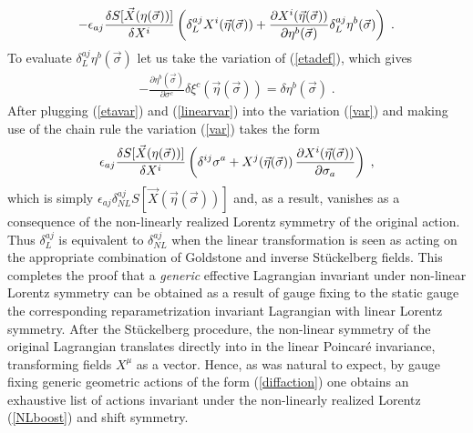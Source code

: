 \documentclass[%
 reprint,
 amsmath,amssymb,
 aps,
]{revtex4-1}
\begin{document}
\begin{gather}
\label{var}
-\epsilon_{a j} {\delta S[\vec{X}(\eta(\vec{\sigma}))]\over \delta X^i}
\left(\delta^{a j}_L X^i(\vec{\eta}(\vec{\sigma})) +
    \frac{\partial X^i (\vec{\eta}(\vec{\sigma}))}{\partial \eta^b(\vec{\sigma})}
    \delta^{a j}_L \eta^b(\vec{\sigma})\right) \; .
\end{gather}
To evaluate $\delta^{a j}_L \eta^b(\vec{\sigma})$ let us take the variation of (\ref{etadef}), which gives
\begin{eqnarray}
\label{etavar}
    - \frac{\partial \eta^b (\vec{\sigma})}{\partial \sigma^c} \delta \xi^c (\vec{\eta}(\vec{\sigma}))
    = \delta \eta^b(\vec{\sigma}) \; .
\end{eqnarray}
After plugging (\ref{etavar}) and (\ref{linearvar}) into the variation (\ref{var}) and making use of the chain rule the variation
(\ref{var}) takes the form
\begin{eqnarray}
    \epsilon_{a j} {\delta S[\vec{X}(\eta(\vec{\sigma}))]\over \delta X^i} \left( \delta^{i j} \sigma^a + X^j(\vec{\eta}(\vec{\sigma})) \,
    \frac{\partial X^i(\vec{\eta}(\vec{\sigma}))}{\partial \sigma_a} \right) \; ,
    \nonumber
\end{eqnarray}
which is simply $ \epsilon_{a j} \delta^{a j}_{NL} S \left[ \vec{X}(\vec{\eta}(\vec{\sigma}) )\right]$ and, as a result, vanishes as a consequence of
the non-linearly realized Lorentz symmetry of the original action.
Thus $\delta^{a j}_L$ is equivalent to $\delta^{a j}_{NL}$ when the linear transformation
is seen as acting on the appropriate combination of Goldstone and inverse
St\"uckelberg fields.
This completes the proof that a \emph{generic} effective Lagrangian invariant under non-linear Lorentz symmetry can
be obtained as a result of gauge fixing to the static gauge the corresponding reparametrization invariant Lagrangian
with linear Lorentz symmetry. After the St\"uckelberg procedure, the non-linear symmetry of the original Lagrangian
translates directly into in the linear Poincar\'e invariance, transforming fields $X^{\mu}$ as a vector.
Hence, as was natural to expect, by gauge fixing generic geometric actions of the form (\ref{diffaction}) one obtains an exhaustive list
of actions invariant under the non-linearly realized  Lorentz (\ref{NLboost}) and shift symmetry.

\end{document}
